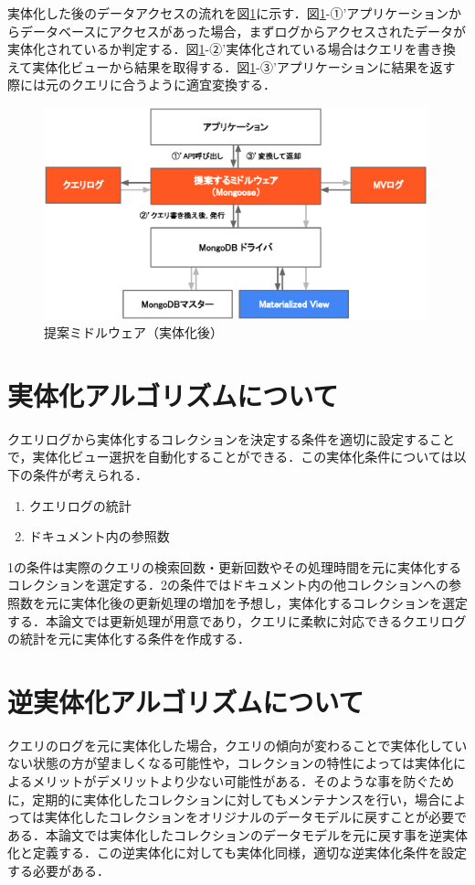 \documentclass[a4paper,11pt]{ujreport}
\begin{document}
実体化した後のデータアクセスの流れを図\ref{figure:MidlewareMv}に示す．図\ref{figure:MidlewareMv}-①’アプリケーションからデータベースにアクセスがあった場合，まずログからアクセスされたデータが実体化されているか判定する．図\ref{figure:MidlewareMv}-②’実体化されている場合はクエリを書き換えて実体化ビューから結果を取得する．図\ref{figure:MidlewareMv}-③’アプリケーションに結果を返す際には元のクエリに合うように適宜変換する．
\begin{figure}[htbp]
	\begin{center}
		\includegraphics[width=30em]{src/MidlewareMv.eps} %
	\end{center}
	\caption{提案ミドルウェア（実体化後）}
	\label{figure:MidlewareMv}
\end{figure}

\section{実体化アルゴリズムについて}
クエリログから実体化するコレクションを決定する条件を適切に設定することで，実体化ビュー選択を自動化することができる．この実体化条件については以下の条件が考えられる．
\begin{enumerate}
  \item クエリログの統計
  \item ドキュメント内の参照数
\end{enumerate}
1の条件は実際のクエリの検索回数・更新回数やその処理時間を元に実体化するコレクションを選定する．2の条件ではドキュメント内の他コレクションへの参照数を元に実体化後の更新処理の増加を予想し，実体化するコレクションを選定する．本論文では更新処理が用意であり，クエリに柔軟に対応できるクエリログの統計を元に実体化する条件を作成する．

\section{逆実体化アルゴリズムについて}
クエリのログを元に実体化した場合，クエリの傾向が変わることで実体化していない状態の方が望ましくなる可能性や，コレクションの特性によっては実体化によるメリットがデメリットより少ない可能性がある．そのような事を防ぐために，定期的に実体化したコレクションに対してもメンテナンスを行い，場合によっては実体化したコレクションをオリジナルのデータモデルに戻すことが必要である．本論文では実体化したコレクションのデータモデルを元に戻す事を逆実体化と定義する．この逆実体化に対しても実体化同様，適切な逆実体化条件を設定する必要がある．
\end{document}
